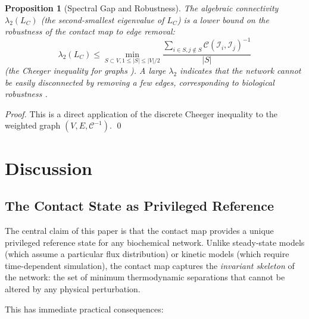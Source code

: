 \documentclass[11pt,twocolumn]{article}
\theoremstyle{plain}
\newtheorem{proposition}[theorem]{Proposition}
\theoremstyle{definition}
\newcommand{\CC}{\mathcal{C}}
\begin{document}
\begin{proposition}[Spectral Gap and Robustness]
\label{prop:spectral_gap}
The algebraic connectivity $\lambda_2(L_C)$ (the second-smallest eigenvalue
of $L_C$) is a lower bound on the robustness of the contact map to edge
removal:
\begin{equation}
  \lambda_2(L_C)
  \leq \min_{S \subset V, 1 \leq |S| \leq |V|/2}
    \frac{\sum_{i \in S, j \notin S} \CC(\mathcal{I}_i, \mathcal{I}_j)^{-1}}
         {|S|}
\end{equation}
(the Cheeger inequality for graphs \cite{chung1997spectral}).
A large $\lambda_2$ indicates that the network cannot be easily disconnected
by removing a few edges, corresponding to biological robustness
\cite{albert2000error, kitano2004biological, stelling2004robustness}.
\end{proposition}

\begin{proof}
This is a direct application of the discrete Cheeger inequality
\cite{chung1997spectral} to the weighted graph $(V, E, \CC^{-1})$. \qed
\end{proof}


\section{Discussion}
\label{sec:discussion}

\subsection{The Contact State as Privileged Reference}

The central claim of this paper is that the contact map provides a unique
privileged reference state for any biochemical network. Unlike steady-state
models (which assume a particular flux distribution) or kinetic models
(which require time-dependent simulation), the contact map captures the
\emph{invariant skeleton} of the network: the set of minimum thermodynamic
separations that cannot be altered by any physical perturbation.

This has immediate practical consequences:
\end{document}

